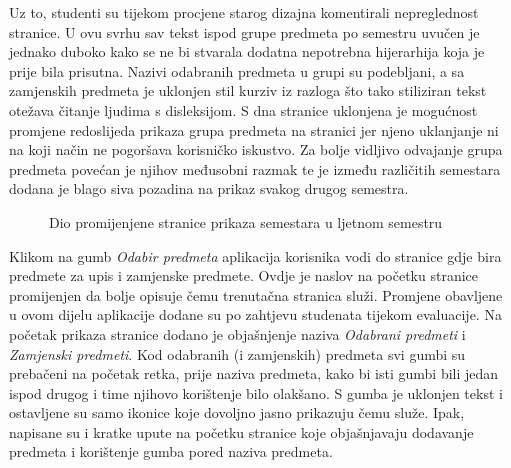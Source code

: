 \documentclass[times, utf8, zavrsni, numeric]{fer}
\begin{document}
        Uz to, studenti su tijekom procjene starog dizajna komentirali nepreglednost stranice. U ovu svrhu sav tekst ispod grupe predmeta po semestru uvučen je jednako duboko kako se ne bi stvarala dodatna nepotrebna hijerarhija koja je prije bila prisutna. Nazivi odabranih predmeta u grupi su podebljani, a sa zamjenskih predmeta je uklonjen stil kurziv iz razloga što tako stiliziran tekst otežava čitanje ljudima s disleksijom. S dna stranice uklonjena je mogućnost promjene redoslijeda prikaza grupa predmeta na stranici jer njeno uklanjanje ni na koji način ne pogoršava korisničko iskustvo. Za bolje vidljivo odvajanje grupa predmeta povećan je njihov međusobni razmak te je između različitih semestara dodana je blago siva pozadina na prikaz svakog drugog semestra.
        
        \begin{figure} [H]
          \centering
          \caption{Dio promijenjene stranice prikaza semestara u ljetnom semestru}
        \end{figure}
        
        \vspace{\baselineskip}
        \bigbreak
        Klikom na gumb \textit{Odabir predmeta} aplikacija korisnika vodi do stranice gdje bira predmete za upis i zamjenske predmete. Ovdje je naslov na početku stranice promijenjen da bolje opisuje čemu trenutačna stranica služi. Promjene obavljene u ovom dijelu aplikacije dodane su po zahtjevu studenata tijekom evaluacije. Na početak prikaza stranice  dodano je objašnjenje naziva \textit{Odabrani predmeti} i \textit{Zamjenski predmeti}. Kod odabranih (i zamjenskih) predmeta svi gumbi su prebačeni na početak retka, prije naziva predmeta, kako bi isti gumbi bili jedan ispod drugog i time njihovo korištenje bilo olakšano. S gumba je uklonjen tekst i ostavljene su samo ikonice koje dovoljno jasno prikazuju čemu služe. Ipak, napisane su i kratke upute na početku stranice koje objašnjavaju dodavanje predmeta i korištenje gumba pored naziva predmeta.
        
\end{document}
